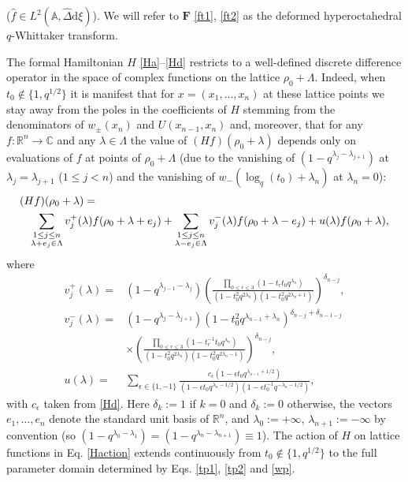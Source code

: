 \documentclass[reqno]{amsart}
\theoremstyle{remark}
\numberwithin{equation}{section}
\begin{document}
($\hat{f}\in L^2(\mathbb{A},\hat{\Delta}\text{d}\xi)$). We will refer to $\boldsymbol{F}$ \eqref{ft1}, \eqref{ft2} as the deformed hyperoctahedral $q$-Whittaker transform.

The formal Hamiltonian $H$ \eqref{Ha}--\eqref{Hd} restricts to a well-defined discrete difference operator in the space of complex functions on the lattice $\rho_0+\Lambda$. Indeed, when $t_0\not\in \{ 1 , q^{1/2}\}$ it is manifest that for $x=(x_1,\ldots ,x_n)$ at these lattice points we stay away from the poles in the coefficients of $H$ stemming from the denominators of  $w_\pm(x_n)$ and $U(x_{n-1},x_n)$ and, moreover, that
for any $f:\mathbb{R}^n\to\mathbb{C}$ and any $\lambda\in\Lambda$ the value of $(Hf)(\rho_0+\lambda)$ 
depends only on evaluations
of $f$ at points of $\rho_0+\Lambda$ (due to the vanishing of
$(1-q^{\lambda_j-\lambda_{j+1}})$ at $\lambda_j=\lambda_{j+1}$ ($1\leq j<n$) and the vanishing of $w_-(\log_q(t_0)+\lambda_n)$ at $\lambda_n=0$):
\begin{eqnarray}\label{Haction}
\lefteqn{(Hf)(\rho_0+\lambda)=}&& \\
&& \sum_{\substack{1\leq j\leq n\\ \lambda +e_j\in\Lambda}} v_j^+(\lambda) f (\rho_0+\lambda +e_j)+ \sum_{\substack{1\leq j\leq n\\ \lambda -e_j\in\Lambda}}v_j^-(\lambda)f (\rho_0+\lambda -e_j) 
+u(\lambda )f (\rho_0+\lambda) ,\nonumber
\end{eqnarray}
where
\begin{align*}
v_j^+(\lambda) =&
(1-q^{\lambda_{j-1}-\lambda_j})\left(\frac{ \prod_{0\leq r \leq 3} (1-{t}_rt_0 q^{\lambda_n})}{(1-t_0^2q^{2\lambda_n})(1-t_0^2q^{2\lambda_n+ 1})}\right)^{\delta_{n-j}} , \\
v_j^-(\lambda) =&
(1-q^{\lambda_{j}-\lambda_{j+1}})(1-t_0^2 q^{\lambda_{n-1}+\lambda_{n}})^{\delta_{n-j}+\delta_{n-1-j}}\\
&\times
\left(\frac{ \prod_{0\leq r \leq 3} (1-{t}_r^{-1}t_0 q^{\lambda_n})}{(1-t_0^2q^{2\lambda_n})(1-t_0^2q^{2\lambda_n- 1})}\right)^{\delta_{n-j}} ,\\
u(\lambda )=&  \sum_{\epsilon \in \{ 1,-1\}}  \frac{c_\epsilon(1-\epsilon t_0 q^{\lambda_{n-1}+1/2})}{(1-\epsilon t_0q^{\lambda_n-1/2})(1-\epsilon t_0^{-1} q^{-\lambda_n-1/2})} ,
\end{align*}
with  $c_\epsilon$ taken from \eqref{Hd}. 
Here $\delta_k:=1 $ if $k=0$ and $\delta_k:=0$ otherwise,
the vectors $e_1,\ldots ,e_n$ denote the standard unit basis of $\mathbb{R}^n$, and
 $\lambda_{0}:=+\infty$, $\lambda_{n+1}:=-\infty$ by convention (so $(1-q^{\lambda_0-\lambda_1})= (1-q^{\lambda_n-\lambda_{n+1}})\equiv 1$).
The action of $H$ on lattice functions  in Eq. \eqref{Haction}  extends continuously from  $t_0\not\in \{ 1 , q^{1/2}\}$ to the full parameter domain determined by Eqs. \eqref{tp1}, \eqref{tp2} and \eqref{wp}.
\end{document}
